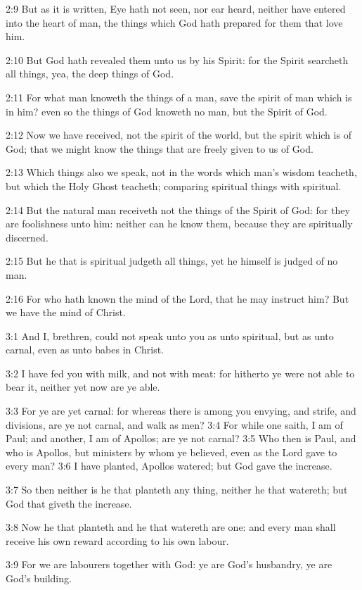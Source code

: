 2:9 But as it is written, Eye hath not seen, nor ear heard, neither have entered into the heart of man, the things which God hath prepared for them that love him.

2:10 But God hath revealed them unto us by his Spirit: for the Spirit searcheth all things, yea, the deep things of God.

2:11 For what man knoweth the things of a man, save the spirit of man which is in him? even so the things of God knoweth no man, but the Spirit of God.

2:12 Now we have received, not the spirit of the world, but the spirit which is of God; that we might know the things that are freely given to us of God.

2:13 Which things also we speak, not in the words which man's wisdom teacheth, but which the Holy Ghost teacheth; comparing spiritual things with spiritual.

2:14 But the natural man receiveth not the things of the Spirit of God: for they are foolishness unto him: neither can he know them, because they are spiritually discerned.

2:15 But he that is spiritual judgeth all things, yet he himself is judged of no man.

2:16 For who hath known the mind of the Lord, that he may instruct him?  But we have the mind of Christ.

3:1 And I, brethren, could not speak unto you as unto spiritual, but as unto carnal, even as unto babes in Christ.

3:2 I have fed you with milk, and not with meat: for hitherto ye were not able to bear it, neither yet now are ye able.

3:3 For ye are yet carnal: for whereas there is among you envying, and strife, and divisions, are ye not carnal, and walk as men?  3:4 For while one saith, I am of Paul; and another, I am of Apollos; are ye not carnal?  3:5 Who then is Paul, and who is Apollos, but ministers by whom ye believed, even as the Lord gave to every man?  3:6 I have planted, Apollos watered; but God gave the increase.

3:7 So then neither is he that planteth any thing, neither he that watereth; but God that giveth the increase.

3:8 Now he that planteth and he that watereth are one: and every man shall receive his own reward according to his own labour.

3:9 For we are labourers together with God: ye are God's husbandry, ye are God's building.


